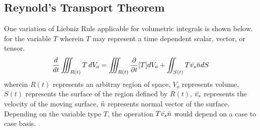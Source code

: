 \documentclass[a4paper, 12pt]{report}
\begin{document}
\begin{center}
\chapter{Reynold's Transport Theorem}
\begin{comment}
Liebnitz Theorem

In the middle of additions:


\end{comment}
One variation of Liebniz Rule applicable for volumetric integrals is shown below. for the variable $T$ wherein $T$ may represent a time dependent scalar, vector, or tensor.
$$\frac{d}{dt}\iiint_{R(t)}T\,dV_o = \iiint_{R(t)}\frac{\partial}{\partial t}[T]dV_o + \iint_{S(t)}T\bar{v_s}\bar{n}dS$$
wherein $R(t)$ represents an arbitray region of space, $V_o$ represents volume, $S(t)$ represents the surface of the region defined by $R(t)$, $\bar{v_s}$ represents the velocity of the moving surface, $\bar{n}$ represents normal vector of the surface. Depending on the variable type $T$, the operation $\displaystyle{T\bar{v_s}\bar{n}}$ would depend on a case to case basis.


\end{center}
\end{document}
